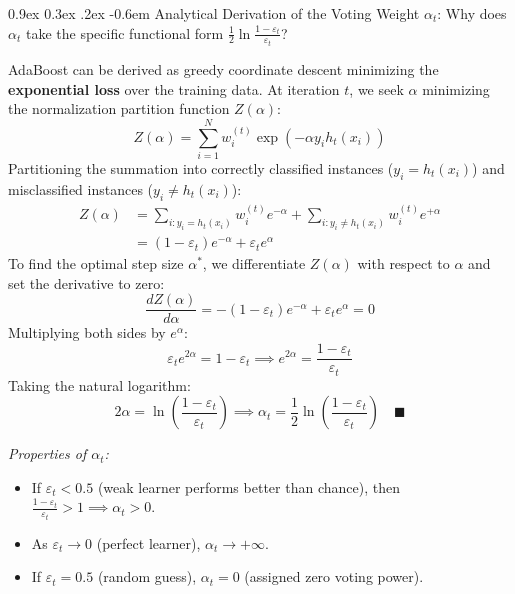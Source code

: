 \documentclass[11pt,a4paper]{article}
\makeatletter
\renewcommand\paragraph{\@startsection{paragraph}{4}{\z@}%
                                     {0.9ex \@plus0.3ex \@minus.2ex}%
                                     {-0.6em}%
                                     {\normalfont\normalsize\bfseries}}
\makeatother
\begin{document}
\paragraph{Analytical Derivation of the Voting Weight $\alpha_t$:}
Why does $\alpha_t$ take the specific functional form $\frac{1}{2}\ln\frac{1-\varepsilon_t}{\varepsilon_t}$? 

AdaBoost can be derived as greedy coordinate descent minimizing the \textbf{exponential loss} over the training data. At iteration $t$, we seek $\alpha$ minimizing the normalization partition function $Z(\alpha)$:
\begin{equation}
    Z(\alpha) = \sum_{i=1}^N w_i^{(t)} \exp\left( -\alpha y_i h_t(x_i) \right)
\end{equation}
Partitioning the summation into correctly classified instances ($y_i = h_t(x_i)$) and misclassified instances ($y_i \ne h_t(x_i)$):
\begin{align}
    Z(\alpha) &= \sum_{i: y_i = h_t(x_i)} w_i^{(t)} e^{-\alpha} + \sum_{i: y_i \ne h_t(x_i)} w_i^{(t)} e^{+\alpha} \nonumber \\
    &= (1 - \varepsilon_t) e^{-\alpha} + \varepsilon_t e^{\alpha}
\end{align}
To find the optimal step size $\alpha^*$, we differentiate $Z(\alpha)$ with respect to $\alpha$ and set the derivative to zero:
\begin{equation}
    \frac{d Z(\alpha)}{d \alpha} = -(1 - \varepsilon_t) e^{-\alpha} + \varepsilon_t e^{\alpha} = 0
\end{equation}
Multiplying both sides by $e^{\alpha}$:
\begin{equation}
    \varepsilon_t e^{2\alpha} = 1 - \varepsilon_t \implies e^{2\alpha} = \frac{1 - \varepsilon_t}{\varepsilon_t}
\end{equation}
Taking the natural logarithm:
\begin{equation}
    2\alpha = \ln \left( \frac{1 - \varepsilon_t}{\varepsilon_t} \right) \implies \alpha_t = \frac{1}{2} \ln \left( \frac{1 - \varepsilon_t}{\varepsilon_t} \right) \quad \blacksquare
\end{equation}

\emph{Properties of $\alpha_t$:}
\begin{itemize}
    \item If $\varepsilon_t < 0.5$ (weak learner performs better than chance), then $\frac{1-\varepsilon_t}{\varepsilon_t} > 1 \implies \alpha_t > 0$.
    \item As $\varepsilon_t \to 0$ (perfect learner), $\alpha_t \to +\infty$.
    \item If $\varepsilon_t = 0.5$ (random guess), $\alpha_t = 0$ (assigned zero voting power).
\end{itemize}
\end{document}
